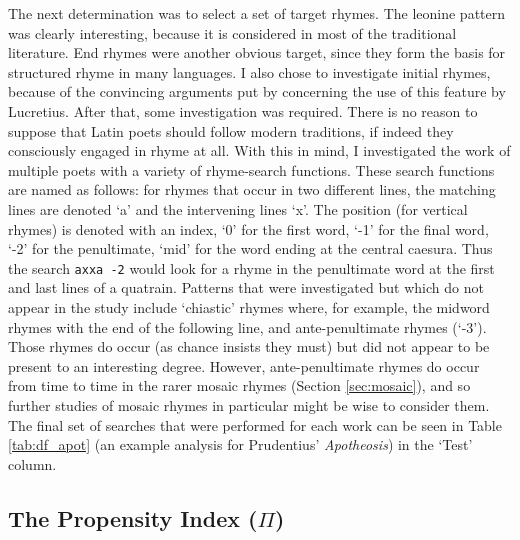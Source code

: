 \documentclass[twocolumn, switch]{article} %
\begin{document}
The next determination was to select a set of target rhymes. The leonine
pattern was clearly interesting, because it is considered in most of the
traditional literature. End rhymes were another obvious target, since they
form the basis for structured rhyme in many languages. I also chose to
investigate initial rhymes, because of the convincing arguments put by
 concerning the use of this feature by Lucretius.
After that, some investigation was required. There is no reason to suppose
that Latin poets should follow modern traditions, if indeed they consciously
engaged in rhyme at all. With this in mind, I investigated the work of
multiple poets with a variety of rhyme-search functions. These search
functions are named as follows: for rhymes that occur in two different lines,
the matching lines are denoted `a' and the intervening lines `x'. The position
(for vertical rhymes) is denoted with an index, `0' for the first word, `-1'
for the final word, `-2' for the penultimate, `mid' for the word ending at the
central caesura. Thus the search \texttt{axxa -2} would look for a rhyme in
the penultimate word at the first and last lines of a quatrain. Patterns that
were investigated but which do not appear in the study include `chiastic'
rhymes where, for example, the midword rhymes with the end of the following
line, and ante-penultimate rhymes (`-3'). Those rhymes do occur (as chance
insists they must) but did not appear to be present to an interesting degree.
However, ante-penultimate rhymes do occur from time to time in the rarer mosaic
rhymes (Section \ref{sec:mosaic}), and so further studies of mosaic rhymes in
particular might be wise to consider them. The final set of searches that were
performed for each work can be seen in Table \ref{tab:df_apot} (an example
analysis for Prudentius' \emph{Apotheosis}) in the `Test' column.

\subsection{The Propensity Index (\texorpdfstring{$\Pi$}{PI})}
\end{document}
